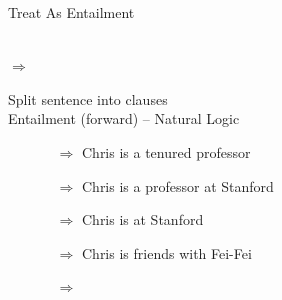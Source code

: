 \documentclass[hyperref]{beamer}
\begin{document}
\begin{frame}{Treat As Entailment}
\begin{center}
   \\ $\Rightarrow$ 
\end{center}

 Split sentence into clauses \\
 Entailment (forward) -- Natural Logic
\begin{itemize}
  \item[] 
    \begin{itemize}
      \item[$\Rightarrow$] Chris is a tenured professor
      \item[$\Rightarrow$] Chris is a professor at Stanford
      \item[$\Rightarrow$] Chris is at Stanford
    \end{itemize}
  \item[] 
    \begin{itemize}
      \item[$\Rightarrow$] Chris is friends with Fei-Fei
      \pause
      \item[$\Rightarrow$] 
    \end{itemize}
\end{itemize}

\end{frame}
\end{document}
